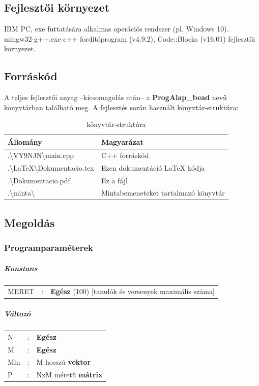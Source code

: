 \documentclass[a4paper]{article}
\begin{document}
    \subsection{Fejlesztői környezet}
    IBM PC, exe futtatására alkalmas operációs rendszer (pl. Windows 10). \\
    mingw32-g++.exe c++ fordítóprogram (v4.9.2), Code::Blocks (v16.01) fejlesztői környezet.
    \subsection{Forráskód}
    A teljes fejlesztői anyag –kicsomagolás után– a \textbf{ProgAlap\_bead} nevű könyvtárban található meg.
    A fejlesztés során használt könyvtár-struktúra:
    \begin{table}[H]
      \centering
      \caption{könyvtár-struktúra}
      \label{tab:table3}
      \begin{tabular}{ll}
        \toprule
        Állomány & Magyarázat \\
        \midrule
        .\textbackslash VY9NJN\textbackslash main.cpp & C++ forráskód \\
        .\textbackslash LaTeX\textbackslash Dokumentacio.tex & Ezen dokumentáció LaTeX kódja \\
        .\textbackslash Dokumentacio.pdf & Ez a fájl \\
        .\textbackslash minta\textbackslash & Mintabemeneteket tartalmazó könyvtár \\
        \bottomrule
      \end{tabular}
    \end{table}
    \subsection{Megoldás}
      \subsubsection{Programparaméterek}
        \subparagraph{Konstans}
        \begin{center}
        \begin{tabular}{lcl}
          MERET & : & \textbf{Egész} (100) [tanulók és versenyek maximális száma]  \\
        \end{tabular}
        \end{center}
        \subparagraph{Változó}
        \begin{center}
        \begin{tabular}{lcl}
          N & : & \textbf{Egész} \\
          M & : & \textbf{Egész} \\
          Min & : & M hosszú \textbf{vektor} \\
          P & : & NxM méretű \textbf{mátrix} \\
        \end{tabular}
        \end{center}
\end{document}

